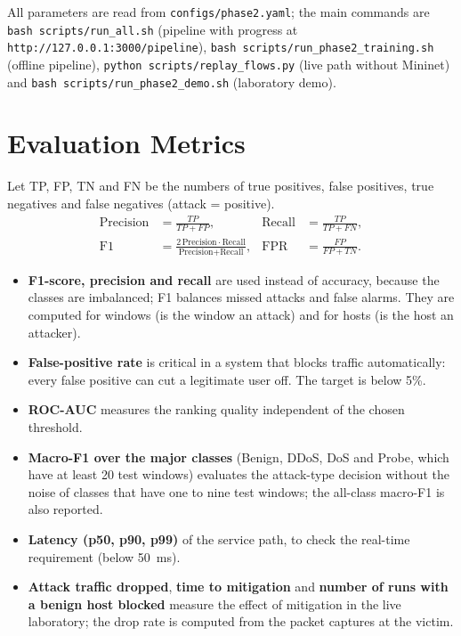 \begin{appendices}
All parameters are read from \texttt{configs/phase2.yaml}; the main commands are \texttt{bash scripts/run\_all.sh} (pipeline with progress at \texttt{http://127.0.0.1:3000/pipeline}), \texttt{bash scripts/run\_phase2\_training.sh} (offline pipeline), \texttt{python scripts/replay\_flows.py} (live path without Mininet) and \texttt{bash scripts/run\_phase2\_demo.sh} (laboratory demo).

\section{Evaluation Metrics}
Let TP, FP, TN and FN be the numbers of true positives, false positives, true negatives and false negatives (attack = positive).
\begin{align}
\text{Precision} &= \frac{TP}{TP+FP}, & \text{Recall} &= \frac{TP}{TP+FN}, \\
\text{F1} &= \frac{2\,\text{Precision}\cdot\text{Recall}}{\text{Precision}+\text{Recall}}, & \text{FPR} &= \frac{FP}{FP+TN}.
\end{align}
\begin{itemize}
	\item \textbf{F1-score, precision and recall} are used instead of accuracy, because the classes are imbalanced; F1 balances missed attacks and false alarms. They are computed for windows (is the window an attack) and for hosts (is the host an attacker).
	\item \textbf{False-positive rate} is critical in a system that blocks traffic automatically: every false positive can cut a legitimate user off. The target is below 5\%.
	\item \textbf{ROC-AUC} measures the ranking quality independent of the chosen threshold.
	\item \textbf{Macro-F1 over the major classes} (Benign, DDoS, DoS and Probe, which have at least 20 test windows) evaluates the attack-type decision without the noise of classes that have one to nine test windows; the all-class macro-F1 is also reported.
	\item \textbf{Latency (p50, p90, p99)} of the service path, to check the real-time requirement (below 50~ms).
	\item \textbf{Attack traffic dropped}, \textbf{time to mitigation} and \textbf{number of runs with a benign host blocked} measure the effect of mitigation in the live laboratory; the drop rate is computed from the packet captures at the victim.
\end{itemize}


\end{appendices}

